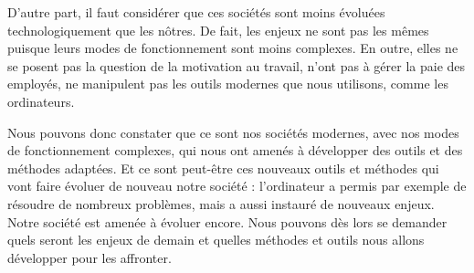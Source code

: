 D'autre part, il faut considérer que ces sociétés sont moins évoluées technologiquement que les nôtres. De fait, les enjeux ne sont pas les mêmes puisque leurs modes de fonctionnement sont moins complexes. En outre, elles ne se posent pas la question de la motivation au travail, n'ont pas à gérer la paie des employés, ne manipulent pas les outils modernes que nous utilisons, comme les ordinateurs.

Nous pouvons donc constater que ce sont nos sociétés modernes, avec nos modes de fonctionnement complexes, qui nous ont amenés à développer des outils et des méthodes adaptées. Et ce sont peut-être ces nouveaux outils et méthodes qui vont faire évoluer de nouveau notre société : l'ordinateur a permis par exemple de résoudre de nombreux problèmes, mais a aussi instauré de nouveaux enjeux.\\

Notre société est amenée à évoluer encore. Nous pouvons dès lors se demander quels seront les enjeux de demain et quelles méthodes et outils nous allons développer pour les affronter.
